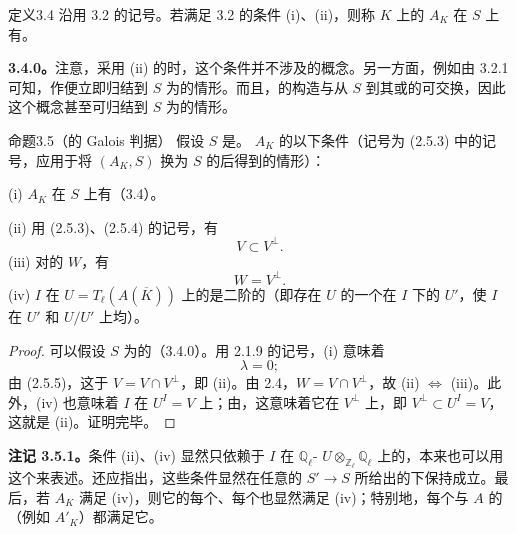 \begin{SGAresult}{定义}{3.4}
沿用 3.2 的记号。若满足 3.2 的条件 (i)、(ii)，则称 $K$ 上的 $A_K$ 在 $S$ 上有。
\end{SGAresult}
\textbf{3.4.0。}注意，采用 (ii) 的时，这个条件并不涉及的概念。另一方面，例如由 3.2.1 可知，作便立即归结到 $S$ 为的情形。而且，的构造与从 $S$ 到其或的可交换，因此这个概念甚至可归结到 $S$ 为的情形。
\begin{SGAresult}{命题}{3.5（的 Galois 判据）}
假设 $S$ 是。 $A_K$ 的以下条件（记号为 (2.5.3) 中的记号，应用于将 $(A_K,S)$ 换为 $S$ 的后得到的情形）：

 (i) $A_K$ 在 $S$ 上有（3.4）。

 (ii) 用 (2.5.3)、(2.5.4) 的记号，有
\[
 V\subset V^\perp.
\]
 (iii) 对的 $W$，有
\[
 W=V^\perp.
\]
 (iv)  $I$ 在 $U=T_\ell(A(\overline K))$ 上的是二阶的（即存在 $U$ 的一个在 $I$ 下的 $U'$，使 $I$ 在 $U'$ 和 $U/U'$ 上均）。
\end{SGAresult}
\begin{proof}
可以假设 $S$ 为的（3.4.0）。用 2.1.9 的记号，(i) 意味着
\[
 \lambda=0;
\]
由 (2.5.5)，这于 $V=V\cap V^\perp$，即 (ii)。由 2.4，$W=V\cap V^\perp$，故 (ii) $\Longleftrightarrow$ (iii)。此外，(iv) 也意味着 $I$ 在 $U^I=V$ 上；由，这意味着它在 $V^\perp$ 上，即 $V^\perp\subset U^I=V$，这就是 (ii)。证明完毕。
\end{proof}
\textbf{注记 3.5.1。}条件 (ii)、(iv) 显然只依赖于 $I$ 在 $\mathbb Q_\ell$- $U\otimes_{\mathbb Z_\ell}\mathbb Q_\ell$ 上的，本来也可以用这个来表述。还应指出，这些条件显然在任意的
$S'\to S$ 所给出的下保持成立。最后，若 $A_K$ 满足 (iv)，则它的每个、每个也显然满足 (iv)；特别地，每个与 $A$ 的（例如 $A'_K$）都满足它。

